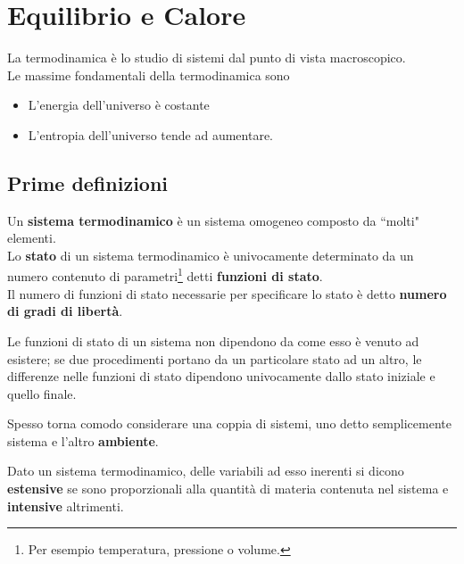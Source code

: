 \chapter{Equilibrio e Calore}
\noindent
La termodinamica \`e lo studio di sistemi dal punto di vista macroscopico.\\
Le massime fondamentali della termodinamica sono
\begin{itemize}
\item L'energia dell'universo \`e costante
\item L'entropia dell'universo tende ad aumentare.
\end{itemize}

\section{Prime definizioni}
\begin{definition}
Un \textbf{sistema termodinamico} \`e un sistema omogeneo composto da ``molti" elementi.\\
Lo \textbf{stato} di un sistema termodinamico \`e univocamente determinato da un numero contenuto di parametri\footnote{Per esempio temperatura, pressione o volume.} detti \textbf{funzioni di stato}.\\
Il numero di funzioni di stato necessarie per specificare lo stato \`e detto \textbf{numero di gradi di libert\`a}.
\end{definition}

\begin{remark}
Le funzioni di stato di un sistema non dipendono da come esso \`e venuto ad esistere; se due procedimenti portano da un particolare stato ad un altro, le differenze nelle funzioni di stato dipendono univocamente dallo stato iniziale e quello finale.
\end{remark}

\begin{remark}
Spesso torna comodo considerare una coppia di sistemi, uno detto semplicemente sistema e l'altro \textbf{ambiente}.
\end{remark}

\begin{definition}
Dato un sistema termodinamico, delle variabili ad esso inerenti si dicono \textbf{estensive} se sono proporzionali alla quantit\`a di materia contenuta nel sistema e \textbf{intensive} altrimenti.
\end{definition}

